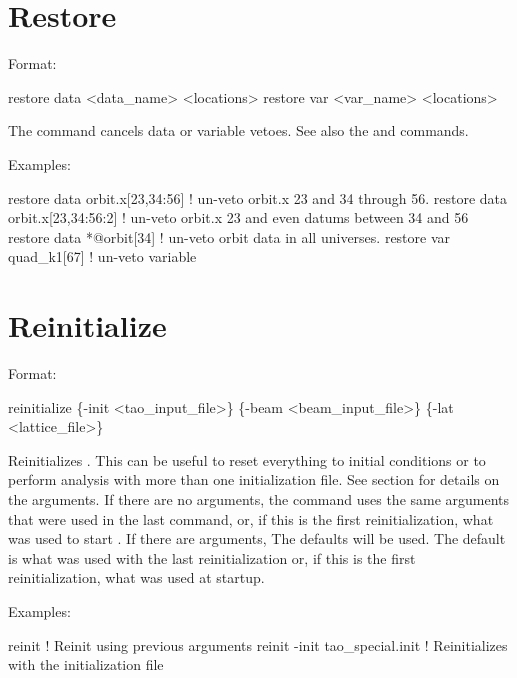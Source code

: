 \section{Restore}
\label{s:restore}

Format:
\begin{example}
  restore data  <data_name> <locations>
  restore var <var_name> <locations>
\end{example}

\vskip 0.2in 
The  command cancels data or variable
vetoes. See also the 
and  commands.

Examples:
\begin{example}
  restore data orbit.x[23,34:56]   ! un-veto orbit.x 23 and 34 through 56.
  restore data orbit.x[23,34:56:2] ! un-veto orbit.x 23 and even datums between 34 and 56
  restore data *@orbit[34]         ! un-veto orbit data in all universes.
  restore var quad_k1[67]          ! un-veto variable
\end{example}

\section{Reinitialize}
\label{s:reinit}

Format:
\begin{example}
  reinitialize \{-init <tao_input_file>\} \{-beam <beam_input_file>\} \{-lat <lattice_file>\}
\end{example}

\vskip 0.2in 

Reinitializes \tao. This can be useful to reset everything to initial
conditions or to perform analysis with more than one initialization
file.  See section  for details on the arguments.
If there are no arguments, the  command uses the same
arguments that were used in the last  command, or, if
this is the first reinitialization, what was used to start \tao. If
there are arguments, The defaults will be used.  The default
 is what was used with the last reinitialization or,
if this is the first reinitialization, what was used at startup.

Examples:
\begin{example}
  reinit                         ! Reinit using previous arguments
  reinit -init tao_special.init  ! Reinitializes \tao with the initialization file 
\end{example}


